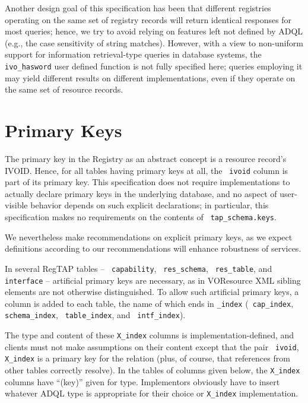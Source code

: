 \documentclass[11pt,a4paper]{ivoa}
\newcommand{\rtent}[1]{\texttt{\color{rtcolor} #1}}
\newcommand{\tapent}[1]{\texttt{\color{tapcolor} #1}}
\begin{document}
Another design goal of this specification has been that different registries
operating on the same set of registry records will return identical responses
for most queries; hence, we try to avoid relying on features left not
defined by ADQL (e.g., the case sensitivity of string matches).  However,
with a view to non-uniform support for information retrieval-type
queries in database systems, the \rtent{ivo\_hasword} user defined
function is not fully specified here; queries employing it may yield
different results on different implementations, even if they operate on
the same set of resource records.


\section{Primary Keys}

\label{primarykeys}

The primary key in the Registry as an abstract concept is a resource
record's IVOID.  Hence, for all tables having primary keys at all, the
\rtent{ivoid} column is part of its primary key.  This
specification does not require implementations to actually declare
primary keys in the underlying database, and no aspect of user-visible
behavior depends on such explicit declarations; in particular, this
specification makes no requirements on the contents of
\tapent{tap\_schema.keys}.

We nevertheless make recommendations on explicit primary keys, as
we expect definitions according to our recommendations will enhance
robustness of services.

In several RegTAP tables -- \rtent{capability},
\rtent{res\_schema}, \rtent{res\_table}, and
\rtent{interface} -- artificial primary keys are necessary, as
in VOResource XML sibling elements are not otherwise distinguished.  To
allow such artificial primary keys, a column is added to each table, the
name of which ends in \texttt{\_index} (\rtent{cap\_index},
\rtent{schema\_index}, \rtent{table\_index}, and
\rtent{intf\_index}).

The type and content of these \texttt{X\_index} columns is
implementation-defined, and clients must not make assumptions on their
content except that the pair \rtent{ivoid}, \texttt{X\_index} is a primary
key for the relation (plus, of course, that references from other tables
correctly resolve).  In the tables of columns given below, the
\texttt{X\_index} columns have ``(key)'' given for type.  Implementors
obviously have to insert whatever ADQL type is appropriate for their
choice or \texttt{X\_index} implementation.
\end{document}
